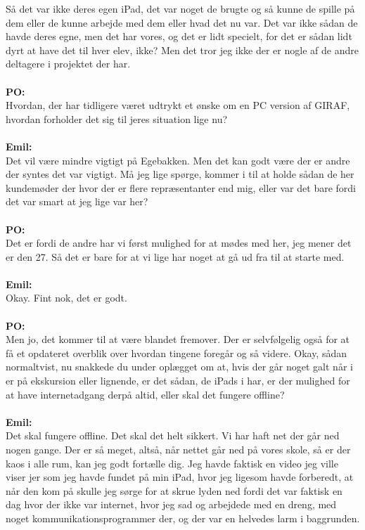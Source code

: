 Så det var ikke deres egen iPad, det var noget de brugte og så kunne de spille på dem eller de kunne arbejde med dem eller hvad det nu var.   
Det var ikke sådan de havde deres egne, men det har vores, og det er lidt specielt, for det er sådan lidt dyrt at have det til hver elev, ikke?
Men det tror jeg ikke der er nogle af de andre deltagere i projektet der har.
\\\\
\textbf{PO:}\\
Hvordan, der har tidligere været udtrykt et ønske om en PC version af GIRAF, hvordan forholder det sig til jeres situation lige nu?
\\\\
\textbf{Emil:}\\
Det vil være mindre vigtigt på Egebakken.
Men det kan godt være der er andre der syntes det var vigtigt.
Må jeg lige spørge, kommer i til at holde sådan de her kundemøder der hvor der er flere repræsentanter end mig, eller var det bare fordi det var smart at jeg lige var her?
\\\\
\textbf{PO:}\\
Det er fordi de andre har vi først mulighed for at mødes med her, jeg mener det er den 27. 
Så det er bare for at vi lige har noget at gå ud fra til at starte med.
\\\\
\textbf{Emil:}\\
Okay.
Fint nok, det er godt.
\\\\
\textbf{PO:}\\
Men jo, det kommer til at være blandet fremover.
Der er selvfølgelig også for at få et opdateret overblik over hvordan tingene foregår og så videre.
Okay, sådan normaltvist, nu snakkede du under oplægget om at, hvis der går noget galt når i er på ekskursion eller lignende, er det sådan, de iPads i har, er der mulighed for at have internetadgang derpå altid, eller skal det fungere offline?
\\\\
\textbf{Emil:}\\
Det skal fungere offline.
Det skal det helt sikkert.
Vi har haft net der går ned nogen gange. 
Der er så meget, altså, når nettet går ned på vores skole, så er der kaos i alle rum, kan jeg godt fortælle dig.
Jeg havde faktisk en video jeg ville viser jer som jeg havde fundet på min iPad, hvor jeg ligesom havde forberedt, at når den kom på skulle jeg sørge for at skrue lyden ned fordi det var faktisk en dag hvor der ikke var internet, hvor jeg sad og arbejdede med en dreng, med noget kommunikationsprogrammer der, og der var en helvedes larm i baggrunden. 
